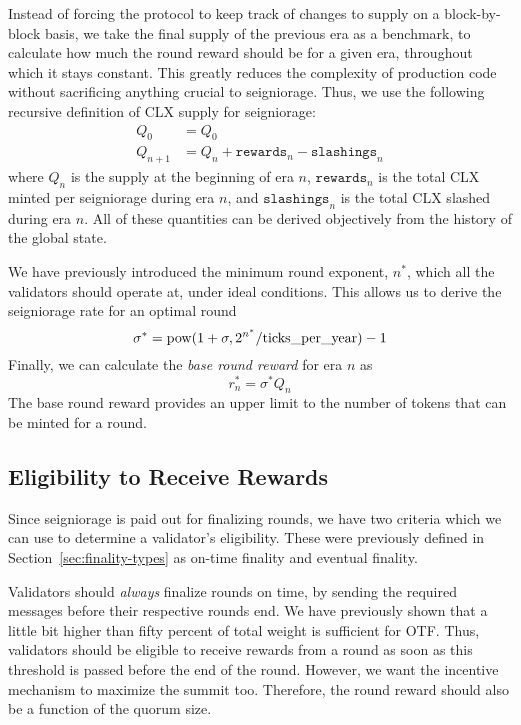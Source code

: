 Instead of forcing the protocol to keep track of changes to supply on a block-by-block basis, we take the final supply of the previous era as a benchmark, to calculate how much the round reward should be for a given era, throughout which it stays constant. This greatly reduces the complexity of production code without sacrificing anything crucial to seigniorage. Thus, we use the following recursive definition of CLX supply for seigniorage:
%
\begin{equation}
  \begin{aligned}
    Q_0 &= Q_0 \\
    Q_{n+1} &= Q_n
    + \texttt{rewards}_n
    - \texttt{slashings}_n
  \end{aligned}
\end{equation}
%
where $Q_n$ is the supply at the beginning of era $n$, $\texttt{rewards}_n$ is the total CLX minted per seigniorage during era $n$, and $\texttt{slashings}_n$ is the total CLX slashed during era $n$. All of these quantities can be derived objectively from the history of the global state.

We have previously introduced the minimum round exponent, $n^\ast$, which all the validators should operate at, under ideal conditions. This allows us to derive the seigniorage rate for an optimal round
%
\begin{equation}
  \sigma^\ast = \operatorname*{pow}(1 + \sigma, 2^{n^\ast}/\text{ticks\_per\_year}) - 1
\end{equation}
%
Finally, we can calculate the \emph{base round reward} for era $n$ as
%
\begin{equation}
  r^\ast_n = \sigma^\ast Q_n
\end{equation}
%
The base round reward provides an upper limit to the number of tokens that can be minted for a round.


\subsection{Eligibility to Receive Rewards}

Since seigniorage is paid out for finalizing rounds, we have two criteria which we can use to determine a validator's eligibility. These were previously defined in Section~\ref{sec:finality-types} as on-time finality and eventual finality.

Validators should \emph{always} finalize rounds on time, by sending the required messages before their respective rounds end. We have previously shown that a little bit higher than fifty percent of total weight is sufficient for OTF. Thus, validators should be eligible to receive rewards from a round as soon as this threshold is passed before the end of the round. However, we want the incentive mechanism to maximize the summit too. Therefore, the round reward should also be a function of the quorum size.

